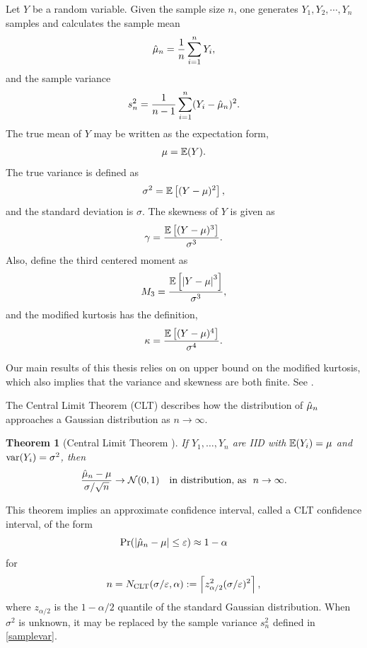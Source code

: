 \documentclass{iitthesis}
\newtheorem{theorem}{Theorem}[section]
\theoremstyle{definition}
\begin{document}
Let $Y$ be a random variable. Given the sample size $n$, one generates $Y_1, Y_2, \cdots, Y_n$ samples and calculates the sample mean 
\begin{align}\label{samplemean}
\hat{\mu}_n = \frac1n\sum_{i=1}^n Y_i,
\end{align}
and the sample variance
\begin{align}\label{samplevar}
s^2_n = \frac{1}{n-1}\sum_{i=1}^n (Y_i-\hat{\mu}_n)^2.
\end{align}
The true mean of $Y$ may be written as the expectation form,
\begin{align}\label{truemean}
\mu = \mathbb{E}(Y).
\end{align}
The true variance is defined as
\begin{align}\label{truevar}
\sigma^2 = \mathbb{E}\left[(Y-\mu)^2\right],
\end{align}
and the standard deviation is $\sigma$. The skewness of $Y$ is given as 
\begin{align*}%
\gamma = \frac{\e\left[(Y-\mu)^3\right]}{\sigma^3}.
\end{align*}
Also, define the third centered moment as
\begin{align}\label{def:M3}
M_3 = \frac{\mathbb{E}\left[\left \lvert Y-\mu \right \rvert^3\right]}{\sigma^3},
\end{align}
and the modified kurtosis has the definition,
\begin{align}\label{kurtosis}
\kappa = \frac{\mathbb{E}\left[(Y-\mu)^4\right]}{\sigma^4}.
\end{align}

Our main results of this thesis relies on on upper bound on the modified kurtosis, which also implies that the variance and skewness are both finite. See \cite{HJLO12}.


The Central Limit Theorem (CLT) describes how the distribution of $\hat{\mu}_n$ approaches a Gaussian distribution as $n \to \infty$.
\begin{theorem}[Central Limit Theorem {\cite[Theorem 21.1]{JP04}}] \label{clt} 
If $Y_1, \ldots, Y_n$ are IID with $\mathbb{E}(Y_i)=\mu$ and $\operatorname{var}(Y_i) = \sigma^2$, then
$$
\frac{\hat{\mu}_n-\mu}{\sigma/\sqrt{n}} \to \mathcal{N}(0,1) \quad \text{in distribution, as} \ \ n\to\infty.
$$
\end{theorem}
This theorem implies an approximate confidence interval, called a CLT confidence interval, of the form
\[
\Pr(\left \lvert \hat{\mu}_{n}-\mu \right \rvert \le \varepsilon) \approx 1- \alpha \qquad \]
for 
\begin{equation}\label{NCLT}
n= N_{\text{CLT}}(\sigma/\varepsilon,\alpha) := \left \lceil z_{\alpha/2}^2 (\sigma/\varepsilon)^2 \right \rceil,
\end{equation}
where $z_{\alpha/2}$ is the $1-\alpha/2$ quantile of the standard Gaussian distribution.  When $\sigma^2$ is unknown, it may be replaced by the sample variance $s_n^2$ defined in \eqref{samplevar}.
\end{document}
